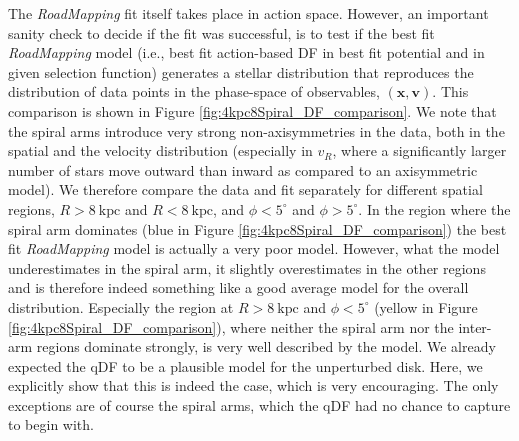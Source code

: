 \documentclass[iop,revtex4,numberedappendix,appendixfloats]{emulateapj}
\newcommand{\vect}[1]{\boldsymbol{#1}}
\newcommand{\RM}{{\sl RoadMapping}}
\begin{document}
The \RM{} fit itself takes place in action space. However, an important sanity check to decide if the fit was successful, is to test if the best fit \RM{} model (i.e., best fit action-based DF in best fit potential and in given selection function) generates a stellar distribution that reproduces the distribution of data points in the phase-space of observables, $(\vect{x},\vect{v})$. This comparison is shown in Figure \ref{fig:4kpc8Spiral_DF_comparison}. 
We note that the spiral arms introduce very strong non-axisymmetries in the data, both in the spatial and the velocity distribution (especially in $v_R$, where a significantly larger number of stars move outward than inward as compared to an axisymmetric model). We therefore compare the data and fit separately for different spatial regions, $R>8~\text{kpc}$ and $R<8~\text{kpc}$, and $\phi<5^\circ$ and $\phi>5^\circ$. In the region where the spiral arm dominates (blue in Figure \ref{fig:4kpc8Spiral_DF_comparison}) the best fit \RM{} model is actually a very poor model. However, what the model underestimates in the spiral arm, it slightly overestimates in the other regions and is therefore indeed something like a good average model for the overall distribution. Especially the region at $R>8~\text{kpc}$ and $\phi<5^\circ$ (yellow in Figure \ref{fig:4kpc8Spiral_DF_comparison}), where neither the spiral arm nor the inter-arm regions dominate strongly, is very well described by the model. We already expected the qDF to be a plausible model for the unperturbed disk. Here, we explicitly show that this is indeed the case, which is very encouraging. The only exceptions are of course the spiral arms, which the qDF had no chance to capture to begin with.
\end{document}
